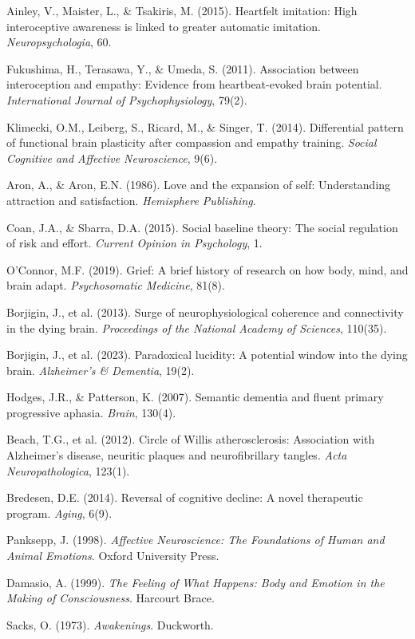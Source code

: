  Ainley, V., Maister, L., \& Tsakiris, M. (2015). Heartfelt imitation: High interoceptive awareness is linked to greater automatic imitation. \emph{Neuropsychologia}, 60.

 Fukushima, H., Terasawa, Y., \& Umeda, S. (2011). Association between interoception and empathy: Evidence from heartbeat-evoked brain potential. \emph{International Journal of Psychophysiology}, 79(2).

 Klimecki, O.M., Leiberg, S., Ricard, M., \& Singer, T. (2014). Differential pattern of functional brain plasticity after compassion and empathy training. \emph{Social Cognitive and Affective Neuroscience}, 9(6).

 Aron, A., \& Aron, E.N. (1986). Love and the expansion of self: Understanding attraction and satisfaction. \emph{Hemisphere Publishing}.

 Coan, J.A., \& Sbarra, D.A. (2015). Social baseline theory: The social regulation of risk and effort. \emph{Current Opinion in Psychology}, 1.

 O’Connor, M.F. (2019). Grief: A brief history of research on how body, mind, and brain adapt. \emph{Psychosomatic Medicine}, 81(8).

 Borjigin, J., et al. (2013). Surge of neurophysiological coherence and connectivity in the dying brain. \emph{Proceedings of the National Academy of Sciences}, 110(35).

 Borjigin, J., et al. (2023). Paradoxical lucidity: A potential window into the dying brain. \emph{Alzheimer’s \& Dementia}, 19(2).

 Hodges, J.R., \& Patterson, K. (2007). Semantic dementia and fluent primary progressive aphasia. \emph{Brain}, 130(4).

 Beach, T.G., et al. (2012). Circle of Willis atherosclerosis: Association with Alzheimer’s disease, neuritic plaques and neurofibrillary tangles. \emph{Acta Neuropathologica}, 123(1).

 Bredesen, D.E. (2014). Reversal of cognitive decline: A novel therapeutic program. \emph{Aging}, 6(9).

 Panksepp, J. (1998). \emph{Affective Neuroscience: The Foundations of Human and Animal Emotions}. Oxford University Press.

 Damasio, A. (1999). \emph{The Feeling of What Happens: Body and Emotion in the Making of Consciousness}. Harcourt Brace.

 Sacks, O. (1973). \emph{Awakenings}. Duckworth.

